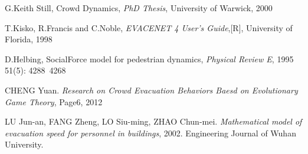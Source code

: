 \documentclass[12pt]{article}
\begin{document}
\begin{thebibliography}{99}
G.Keith Still, Crowd Dynamics, \emph{PhD Thesis}, University of Warwick, 2000

T.Kisko, R.Francis and C.Noble, \emph{EVACENET 4 User's Guide},[R], University of Florida, 1998

D.Helbing, SocialForce model for pedestrian dynamics,  \emph{Physical Review E}, 1995 51(5):
4288~4268

CHENG Yuan. \emph{Research on Crowd Evacuation Behaviors Baesd on Evolutionary Game Theory}, Page6, 2012

LU Jun-an, FANG Zheng, LO Siu-ming, ZHAO Chun-mei. \emph{Mathematical model of evacuation speed for personnel in buildings}, 2002. Engineering Journal of Wuhan University.

\end{thebibliography}
\end{document}
